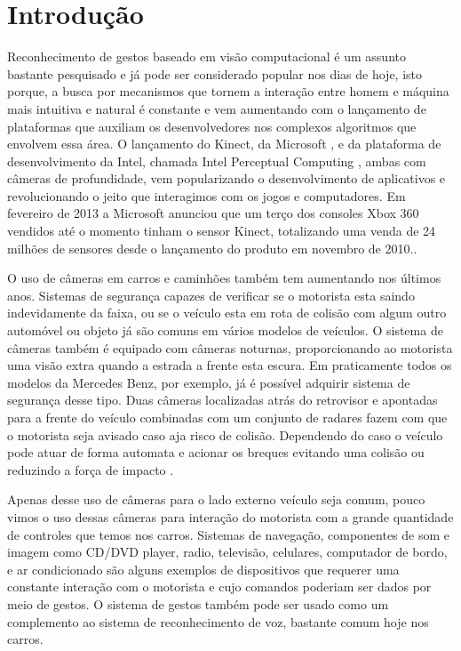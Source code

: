 \chapter{Introdução}

Reconhecimento de gestos baseado em visão computacional é um assunto bastante pesquisado e já pode ser considerado popular nos dias de hoje, isto porque, a busca por mecanismos que tornem a interação entre homem e máquina mais intuitiva e natural é constante e vem aumentando com o lançamento de plataformas que auxiliam os desenvolvedores nos complexos algoritmos que envolvem essa área.
O lançamento do Kinect, da Microsoft \cite{kinect}, e da plataforma de desenvolvimento da Intel, chamada Intel Perceptual Computing \cite{intel},  ambas com câmeras de profundidade, vem popularizando o desenvolvimento de aplicativos e revolucionando o jeito que interagimos com os jogos e computadores. Em fevereiro de 2013 a Microsoft anunciou que um terço dos consoles Xbox 360 vendidos até o momento tinham o sensor Kinect, totalizando  uma venda de 24 milhões de sensores desde o lançamento do produto em novembro de 2010.\cite{news:kinect_sales}.

O uso de câmeras em carros e caminhões também tem aumentando nos últimos anos. Sistemas de segurança capazes de verificar se o motorista esta saindo indevidamente da faixa, ou se o veículo esta em rota de colisão com algum outro automóvel ou objeto já são comuns em vários modelos de veículos. O sistema de câmeras também é equipado com câmeras noturnas, proporcionando ao motorista uma visão extra quando a estrada a frente esta escura. Em praticamente todos os modelos da Mercedes Benz, por exemplo, já é possível adquirir sistema de segurança desse tipo. Duas câmeras localizadas atrás do retrovisor e apontadas para a frente do veículo combinadas com um conjunto de radares fazem com que o motorista seja avisado caso aja risco de colisão. Dependendo do caso o veículo pode atuar de forma automata e acionar os breques evitando uma colisão ou reduzindo a força de impacto \cite{mercedes_youtube} \cite{mercedes_safety}. 

Apenas desse uso de câmeras para o lado externo veículo seja comum, pouco vimos o uso dessas câmeras para interação do motorista com a grande quantidade de controles que temos nos carros. Sistemas de navegação, componentes de som e imagem como CD/DVD player, radio, televisão, celulares, computador de bordo, e ar condicionado são alguns exemplos de dispositivos que requerer uma constante interação com o motorista e cujo comandos poderiam ser dados por meio de gestos.
O sistema de gestos também pode ser usado como um complemento ao sistema de reconhecimento de voz, bastante comum hoje nos carros.

